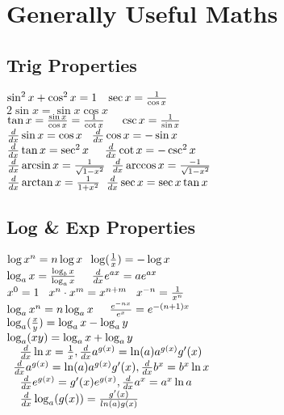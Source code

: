 \section{Generally Useful Maths}
\subsection*{Trig Properties}
$\sin^2x + \cos^2x = 1 \hspace{3mm} \sec x = \frac{1}{\cos x}$\\
$2 \sin x = \sin x \cos x$\\
$\tan x = \frac{\sin x}{\cos x} = \frac{1}{\cot x} \hspace{5mm} \csc x = \frac{1}{\sin x}$\\
$\frac{d}{dx}\sin x= \cos x \hspace{3mm} \frac{d}{dx}\cos x= - \sin x$\\
$\frac{d}{dx}\tan x = \sec^2 x \hspace{5mm} \frac{d}{dx}\cot x = - \csc^2 x$\\
$\frac{d}{dx} \arcsin x = \frac{1}{\sqrt{1 - x^2}}  \hspace{2mm}   \frac{d}{dx} \arccos x = \frac{-1}{\sqrt{1 - x^2}}  $\\
$\frac{d}{dx} \arctan x = \frac{1}{1 + x^2} \hspace{2mm} \frac{d}{dx} \sec x = \sec x \tan x $\\

\subsection*{Log \& Exp Properties}
$ \log x^n = n \log x \hspace{2mm} \log(\frac{1}{x}) = - \log x$\\
$\log_ax = \frac{\log_bx}{\log_ax} \hspace{5mm} \frac{d}{dx}e^{ax} = ae^{ax}$\\
$x^0 = 1 \hspace{3mm} x^n \cdot x^m = x^{n+m} \hspace{3mm} x^{-n} = \frac{1}{x^n}    $\\
$\log_a x^n = n \log_a x \hspace{5mm} \frac{e^{-n x}}{e^x} = e^{-(n+1)x}    $\\
$\log_a (\frac{x}{y}) = \log_a x - \log_a y \hspace{2mm}  $\\
$\log_a (xy) = \log_a x + \log_a y \hspace{2mm}  $\\
$\hspace{4mm} \frac{d}{dx} \ln x = \frac{1}{x} , \frac{d}{dx} a^{g(x)} = \ln (a) a^{g(x)} g'(x)$\\
$\hspace{2mm} \frac{d}{dx} a^{g(x)} = \ln (a) a^{g(x)} g'(x) , \frac{d}{dx} b^x = b^x \ln x  $\\
$\hspace{4mm} \frac{d}{dx} e^{g(x)} = g'(x)e^{g(x)} , \frac{d}{dx}a^{x} = a^{x} \ln a$\\
$\hspace{4mm} \frac{d}{dx} \log_a(g(x)) = \frac{g'(x)}{ln(a)g(x)}$\\

